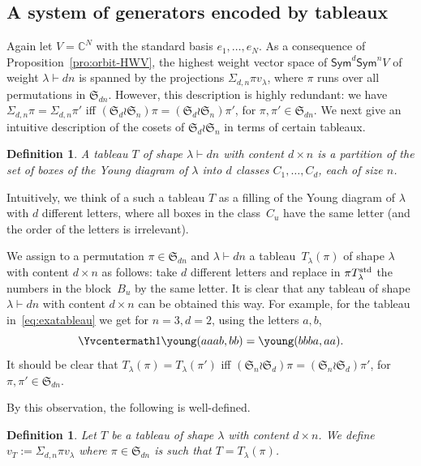 \documentclass[11pt]{amsart}
\def\Sym{\mathsf{Sym}}
\def\la{\lambda}
\newcommand{\out}{d}
\newcommand{\inn}{n}
\newcommand{\IC}{\ensuremath{\mathbb{C}}}
\newcommand{\aS}{\ensuremath{\mathfrak{S}}}
\numberwithin{equation}{section}
\newtheorem{definition}[theorem]{Definition}
\begin{document}
\subsection{A system of generators encoded by tableaux}\label{se:sgen}

Again let $V=\IC^N$ with the standard basis $e_1,\ldots,e_N$. 
As a consequence of Proposition~\ref{pro:orbit-HWV}, 
the highest weight vector space of $\Sym^\out \Sym^\inn V$ 
of weight $\la\vdash dn$ is spanned 
by the projections $\Sigma_{d,n} \pi v_\la$, where $\pi$ 
runs over all permutations in $\aS_{dn}$. 
However, this description is highly redundant: 
we have 
$\Sigma_{d,n}\pi = \Sigma_{d,n}\pi'$ iff 
$(\aS_d \wr \aS_n)\pi = (\aS_d \wr \aS_n)\pi'$,
for $\pi,\pi'\in\aS_{dn}$.
We next give an intuitive description of the cosets of $\aS_d \wr \aS_n$ 
in terms of certain tableaux.


\begin{definition}\label{def:tab-rect-cont}
A {\em tableau $T$ of shape $\la\vdash dn$ with %
content $\out \times \inn$} is a partition %
of the set of boxes of the Young diagram of $\la$  
into $d$ classes $C_1,\ldots,C_d$, each of size $n$. %
\end{definition}

Intuitively, we think of a such a tableau $T$ as a filling of the Young diagram of $\la$ with 
$d$ different letters, where all boxes in the class~$C_u$ have the same letter  
(and the order of the letters is irrelevant). 

We assign to a permutation $\pi\in\aS_{dn}$ and $\la\vdash dn$ 
a tableau~$T_\la(\pi)$ of shape $\la$ with content $d\times n$ as follows: 
take $d$ different letters and replace in $\pi T^{\textup{std}}_\la$ the numbers in the block~$B_u$ 
by the same letter. 
It is clear that any tableau of shape $\la\vdash dn$ with content $d\times n$
can be obtained this way. 
For example, for the tableau in~\eqref{eq:exatableau} we get for $n=3,d=2$, 
using the letters $a,b$, 
\[
\Yvcentermath1 \young(aaab,bb) = \young(bbba,aa).
\]
It should be clear that $T_\la(\pi) = T_\la(\pi')$ iff 
$(\aS_\inn \wr \aS_\out)\pi = (\aS_\inn \wr \aS_\out)\pi'$, 
for $\pi,\pi'\in\aS_{dn}$. 

By this observation, the following is well-defined.

\begin{definition}\label{def:v_T}
Let $T$ be a tableau of shape $\la$ with content $\out \times \inn$.
We define 
$v_T := \Sigma_{d,n}\pi v_\lambda$
where $\pi\in\aS_{dn}$ is such that $T = T_\la(\pi)$. 
\end{definition}
\end{document}
